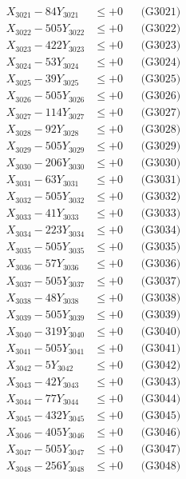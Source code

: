 \documentclass[a4paper,10pt]{article}
\begin{document}
{\begin{align}
\allowbreak
X_{3021} - 84Y_{3021} &\leq +0 && \text{(G3021)} \\
X_{3022} - 505Y_{3022} &\leq +0 && \text{(G3022)} \\
X_{3023} - 422Y_{3023} &\leq +0 && \text{(G3023)} \\
X_{3024} - 53Y_{3024} &\leq +0 && \text{(G3024)} \\
X_{3025} - 39Y_{3025} &\leq +0 && \text{(G3025)} \\
X_{3026} - 505Y_{3026} &\leq +0 && \text{(G3026)} \\
X_{3027} - 114Y_{3027} &\leq +0 && \text{(G3027)} \\
X_{3028} - 92Y_{3028} &\leq +0 && \text{(G3028)} \\
X_{3029} - 505Y_{3029} &\leq +0 && \text{(G3029)} \\
X_{3030} - 206Y_{3030} &\leq +0 && \text{(G3030)} \\
\allowbreak
X_{3031} - 63Y_{3031} &\leq +0 && \text{(G3031)} \\
X_{3032} - 505Y_{3032} &\leq +0 && \text{(G3032)} \\
X_{3033} - 41Y_{3033} &\leq +0 && \text{(G3033)} \\
X_{3034} - 223Y_{3034} &\leq +0 && \text{(G3034)} \\
X_{3035} - 505Y_{3035} &\leq +0 && \text{(G3035)} \\
X_{3036} - 57Y_{3036} &\leq +0 && \text{(G3036)} \\
X_{3037} - 505Y_{3037} &\leq +0 && \text{(G3037)} \\
X_{3038} - 48Y_{3038} &\leq +0 && \text{(G3038)} \\
X_{3039} - 505Y_{3039} &\leq +0 && \text{(G3039)} \\
X_{3040} - 319Y_{3040} &\leq +0 && \text{(G3040)} \\
\allowbreak
X_{3041} - 505Y_{3041} &\leq +0 && \text{(G3041)} \\
X_{3042} - 5Y_{3042} &\leq +0 && \text{(G3042)} \\
X_{3043} - 42Y_{3043} &\leq +0 && \text{(G3043)} \\
X_{3044} - 77Y_{3044} &\leq +0 && \text{(G3044)} \\
X_{3045} - 432Y_{3045} &\leq +0 && \text{(G3045)} \\
X_{3046} - 405Y_{3046} &\leq +0 && \text{(G3046)} \\
X_{3047} - 505Y_{3047} &\leq +0 && \text{(G3047)} \\
X_{3048} - 256Y_{3048} &\leq +0 && \text{(G3048)} \\

\end{align}}
\end{document}
